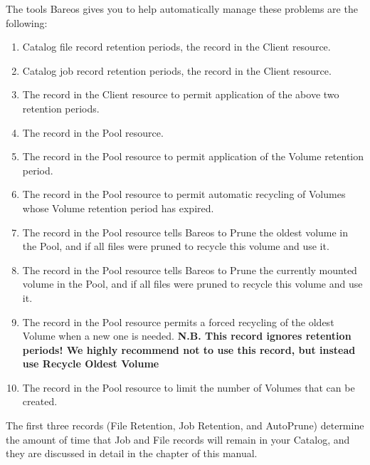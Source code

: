 The tools Bareos gives you to help automatically manage these problems are the
following:

\begin{enumerate}
\item Catalog file record retention periods, the
     record in the Client
   resource.
\item Catalog job record retention periods, the
     record in the Client
   resource.
\item The
    record in the Client resource
   to permit  application of the above two retention periods.
\item The
    record in the Pool
   resource.
\item The
    record in the Pool
   resource to permit  application of the Volume retention period.
\item The
    record in the Pool resource
   to permit  automatic recycling of Volumes whose Volume retention period has
   expired.
\item The
    record in the
   Pool resource tells Bareos  to Prune the oldest volume in the Pool, and if all
   files  were pruned to recycle this volume and use it.
\item The
    record in
   the Pool resource tells Bareos  to Prune the currently mounted volume in the
   Pool, and if all files  were pruned to recycle this volume and use it.
\item The
    record in the
   Pool resource  permits a forced recycling of the oldest Volume when a new one
   is  needed.  {\bf N.B. This record ignores retention periods! We highly
   recommend  not to use this record, but instead use Recycle Oldest Volume}
\item The
    record in the Pool
   resource to limit  the number of Volumes that can be created.
\end{enumerate}

The first three records (File Retention, Job Retention, and AutoPrune)
determine the amount of time that Job and File records will remain in your
Catalog, and they are discussed in detail in the
 chapter of
this manual.

